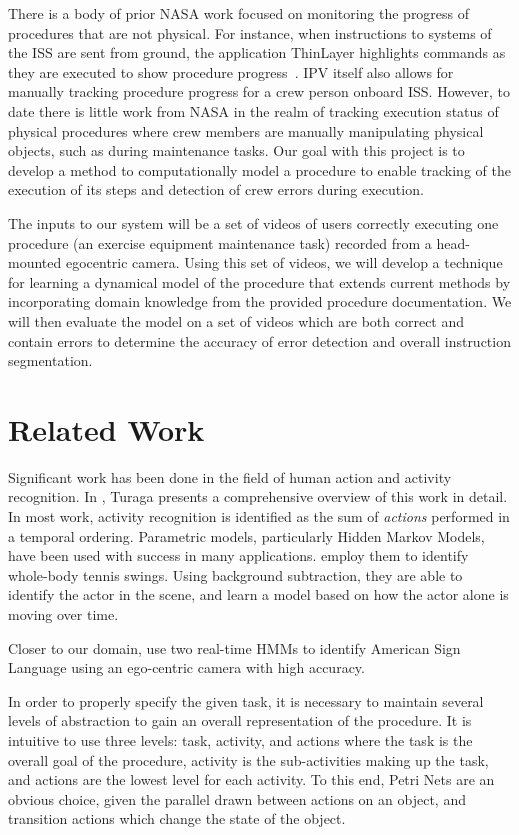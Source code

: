 \documentclass[10pt,letterpaper]{article}
\begin{document}
There is a body of prior NASA work focused on monitoring the progress of procedures that are not physical. For instance, when instructions to systems of the ISS are sent from ground, the application ThinLayer highlights commands as they are executed to show procedure progress~\cite{frank2010plans}. IPV itself also allows for manually tracking procedure progress for a crew person onboard ISS. However, to date there is little work from NASA in the realm of tracking execution status of physical procedures where crew members are manually manipulating physical objects, such as during maintenance tasks. Our goal with this project is to develop a method to computationally model a procedure to enable tracking of the execution of its steps and detection of crew errors during execution.

The inputs to our system will be a set of videos of users correctly executing one procedure (an exercise equipment maintenance task) recorded from a head-mounted egocentric camera. Using this set of videos, we will develop a technique for learning a dynamical model of the procedure that extends current methods by incorporating domain knowledge from the provided procedure documentation. We will then evaluate the model on a set of videos which are both correct and contain errors to determine the accuracy of error detection and overall instruction segmentation.

\section{Related Work}

Significant work has been done in the field of human action and activity recognition. In \cite{turaga2008machine}, Turaga presents a comprehensive overview of this work in detail. In most work, activity recognition is identified as the sum of \emph{actions} performed in a temporal ordering. Parametric models, particularly Hidden Markov Models, have been used with success in many applications. \cite{yamato1992recognizing} employ them to identify whole-body tennis swings. Using background subtraction, they are able to identify the actor in the scene, and learn a model based on how the actor alone is moving over time.

Closer to our domain, \cite{starner1998real} use two real-time HMMs to identify American Sign Language using an ego-centric camera with high accuracy. 
	
In order to properly specify the given task, it is necessary to maintain several levels of abstraction to gain an overall representation of the procedure. It is intuitive to use three levels: task, activity, and actions where the task is the overall goal of the procedure, activity is the sub-activities making up the task, and actions are the lowest level for each activity. To this end, Petri Nets\cite{petri1966communication} are an obvious choice, given the parallel drawn between actions on an object, and transition actions which change the state of the object. 
\end{document}

